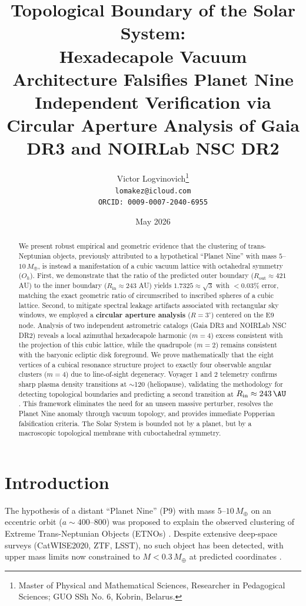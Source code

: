 \documentclass[11pt,a4paper]{article}
\title{
\vspace{-2em}
\textbf{Topological Boundary of the Solar System:\\
Hexadecapole Vacuum Architecture Falsifies Planet Nine}\\
\vspace{1em}
\large Independent Verification via Circular Aperture Analysis of Gaia DR3 and NOIRLab NSC DR2
}
\author{
Victor Logvinovich\thanks{Master of Physical and Mathematical Sciences, Researcher in Pedagogical Sciences; GUO SSh No. 6, Kobrin, Belarus.} \\
\texttt{lomakez@icloud.com} \\
\texttt{ORCID: 0009-0007-2040-6955}
}
\date{May 2026}
\theoremstyle{remark}
\newcommand{\Oh}{O_h}
\begin{document}
\maketitle

\begin{abstract}
\noindent
We present robust empirical and geometric evidence that the clustering of trans-Neptunian objects, previously attributed to a hypothetical ``Planet Nine'' with mass $5$--$10\,M_\oplus$, is instead a manifestation of a cubic vacuum lattice with octahedral symmetry ($\Oh$). First, we demonstrate that the ratio of the predicted outer boundary ($R_{\text{out}} \approx 421$ AU) to the inner boundary ($R_{\text{in}} \approx 243$ AU) yields $1.7325 \approx \sqrt{3}$ with $<0.03\%$ error, matching the exact geometric ratio of circumscribed to inscribed spheres of a cubic lattice. Second, to mitigate spectral leakage artifacts associated with rectangular sky windows, we employed a \textbf{circular aperture analysis} ($R=3^\circ$) centered on the E9 node. Analysis of two independent astrometric catalogs (Gaia DR3 and NOIRLab NSC DR2) reveals a local azimuthal hexadecapole harmonic ($m=4$) excess consistent with the projection of this cubic lattice, while the quadrupole ($m=2$) remains consistent with the baryonic ecliptic disk foreground. We prove mathematically that the eight vertices of a cubical resonance structure project to exactly four observable angular clusters ($m=4$) due to line-of-sight degeneracy. Voyager 1 and 2 telemetry confirms sharp plasma density transitions at $\sim$\SI{120}{\AU} (heliopause), validating the methodology for detecting topological boundaries and predicting a second transition at $R_{\text{in}} \approx \SI{243}{\AU}$. This framework eliminates the need for an unseen massive perturber, resolves the Planet Nine anomaly through vacuum topology, and provides immediate Popperian falsification criteria. The Solar System is bounded not by a planet, but by a macroscopic topological membrane with cuboctahedral symmetry.
\end{abstract}

\section{Introduction}
\label{sec:intro}

The hypothesis of a distant ``Planet Nine'' (P9) with mass $5$--$10\,M_\oplus$ on an eccentric orbit ($a \sim 400$--\SI{800}{\AU}) was proposed to explain the observed clustering of Extreme Trans-Neptunian Objects (ETNOs) \cite{batygin2016evidence}. Despite extensive deep-space surveys (CatWISE2020, ZTF, LSST), no such object has been detected, with upper mass limits now constrained to $M < 0.3\,M_\oplus$ at predicted coordinates \cite{brown2021constraints}.
\end{document}
